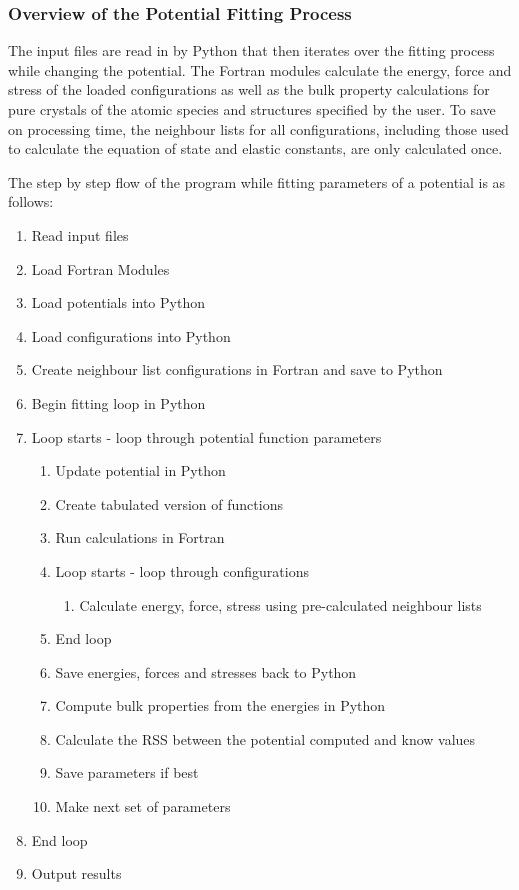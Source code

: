 


\subsubsection{Overview of the Potential Fitting Process}

The input files are read in by Python that then iterates over the fitting process while changing the potential.  The Fortran modules calculate the energy, force and stress of the loaded configurations as well as the bulk property calculations for pure crystals of the atomic species and structures specified by the user.  To save on processing time, the neighbour lists for all configurations, including those used to calculate the equation of state and elastic constants, are only calculated once. 

The step by step flow of the program while fitting parameters of a potential is as follows:

\begin{enumerate}
\item Read input files
\item Load Fortran Modules
\item Load potentials into Python
\item Load configurations into Python
\item Create neighbour list configurations in Fortran and save to Python
\item Begin fitting loop in Python
\item Loop starts - loop through potential function parameters
\begin{enumerate}
\item Update potential in Python
\item Create tabulated version of functions
\item Run calculations in Fortran
\item Loop starts - loop through configurations
\begin{enumerate}
\item Calculate energy, force, stress using pre-calculated neighbour lists
\end{enumerate}
\item End loop
\item Save energies, forces and stresses back to Python
\item Compute bulk properties from the energies in Python
\item Calculate the RSS between the potential computed and know values
\item Save parameters if best
\item Make next set of parameters
\end{enumerate}
\item End loop
\item Output results
\end{enumerate}

